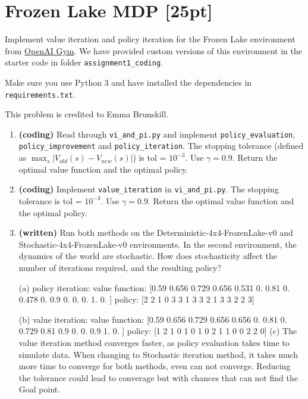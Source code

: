 \documentclass[11pt]{article}
\theoremstyle{case}
\begin{document}
\newpage
\section{Frozen Lake MDP [25pt]}

Implement value iteration and policy iteration for the Frozen Lake environment
from \href{"https://gym.openai.com/envs/FrozenLake-v0"}{OpenAI Gym}. We have provided
custom versions of this environment in the starter code in folder \texttt{assignment1\_coding}.

Make sure you use Python 3 and have installed the dependencies in \texttt{requirements.txt}.

This problem is credited to Emma Brunskill.

\begin{enumerate}[label=(\alph*)]
\item \textbf{(coding)} Read through \texttt{vi\_and\_pi.py} and implement \texttt{policy\_evaluation}, \texttt{policy\_improvement} and \texttt{policy\_iteration}. The stopping tolerance (defined as $\max_s |V_{old}(s) - V_{new}(s)|$) is tol = $10^{-3}$. Use $\gamma = 0.9$. Return the optimal value function and the optimal policy.
\item \textbf{(coding)} Implement \texttt{value\_iteration} in \texttt{vi\_and\_pi.py}. The stopping tolerance is tol =
$10^{-3}$. Use $\gamma = 0.9$. Return the optimal value function and the optimal policy.
\item \textbf{(written)} Run both methods on the Deterministic-4x4-FrozenLake-v0 and Stochastic-4x4-FrozenLake-v0 environments. In the second environment, the dynamics of the world are stochastic. How does stochasticity affect the number of iterations required, and the resulting policy?
\begin{shaded}

	 (a) policy iteration:
			value function:  [0.59  0.656 0.729 0.656 0.531 0.    0.81  0.    0.478 0.    0.9   0. 0.    0.    1.    0.   ]
			policy: [2 2 1 0 3 3 1 3 3 2 1 3 3 2 2 3]
		
	 (b) value iteration:
		  value function: [0.59  0.656 0.729 0.656 0.656 0.    0.81  0.    0.729 0.81  0.9   0.  0.    0.9   1.    0.   ]
		   policy: [1 2 1 0 1 0 1 0 2 1 1 0 0 2 2 0]
    (c)  The value iteration method converges faster, as policy evaluation takes time to simulate data.
		   When changing to Stochastic iteration method, it takes much more time to converge for both methods, even can not converge. Reducing the tolerance could lead to converage but with chances that can not find the Goal point.
\end{shaded}

\end{enumerate}
\end{document}
